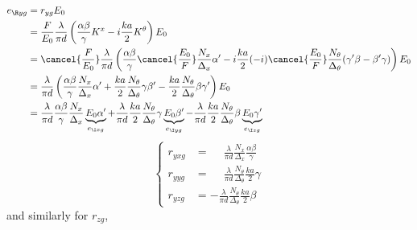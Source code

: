 \begin{refsection}
\begin{align*}
    e_{\R yg}
    &= r_{yg} E_0
    \\
    &= \frac{F}{E_0}
       \frac{\lambda}{\pi d}
       \left(
           \frac{\alpha \beta}{\gamma}
           K^x
           -
           i
           \frac{ka}{2}
           K^\theta           
       \right)
       E_0
    \\
    &= \cancel{\frac{F}{E_0}}
       \frac{\lambda}{\pi d}
       \left(
           \frac{\alpha \beta}{\gamma}
           \cancel{\frac{E_0}{F}}
           \frac{N_x}{\Delta_x}
           \alpha'
           -
           i
           \frac{ka}{2}
           (-i)
           \cancel{\frac{E_0}{F}}
           \frac{N_\theta}{\Delta_\theta}
           (\gamma' \beta - \beta' \gamma)           
       \right)
       E_0
    \\
    &= \frac{\lambda}{\pi d}
       \left(
           \frac{\alpha \beta}{\gamma}
           \frac{N_x}{\Delta_x}
           \alpha'
           +
           \frac{ka}{2}
           \frac{N_\theta}{\Delta_\theta}
           \gamma
           \beta'
           -
           \frac{ka}{2}
           \frac{N_\theta}{\Delta_\theta}
           \beta
           \gamma'
       \right)
       E_0
    \\
    &= \frac{\lambda}{\pi d}
       \frac{\alpha \beta}{\gamma}
       \frac{N_x}{\Delta_x}
       \underbrace{E_0 \alpha'}_{e_{\I xg}}
       +
       \frac{\lambda}{\pi d}
       \frac{ka}{2}
       \frac{N_\theta}{\Delta_\theta}
       \gamma
       \underbrace{E_0 \beta'}_{e_{\I yg}}
       -
       \frac{\lambda}{\pi d}
       \frac{ka}{2}
       \frac{N_\theta}{\Delta_\theta}
       \beta
       \underbrace{E_0 \gamma'}_{e_{\I zg}}
\end{align*}
\begin{equation}
    \left\lbrace
    \begin{aligned}
        r_{yxg}
        &=
        \phantom{-}
        \frac{\lambda}{\pi d}
        \frac{N_x}{\Delta_x}
        \frac{\alpha \beta}{\gamma}
        \\
        r_{yyg}
        &=
        \phantom{-}
        \frac{\lambda}{\pi d}
        \frac{N_\theta}{\Delta_\theta}
        \frac{ka}{2}
        \gamma
        \\
        r_{yzg}
        &=
        -
        \frac{\lambda}{\pi d}
        \frac{N_\theta}{\Delta_\theta}
        \frac{ka}{2}
        \beta
    \end{aligned}
    \right.
\end{equation}
and similarly for $r_{zg}$,

\end{refsection}
